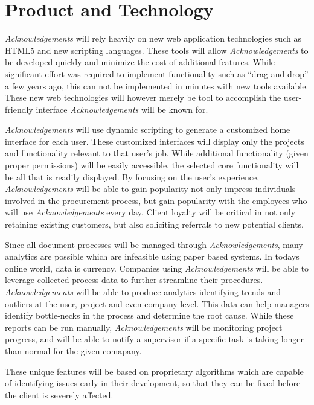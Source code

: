 \section{Product and Technology}
{\it Acknowledgements} will rely heavily on new web application technologies such as HTML5 and new scripting languages. These tools will allow {\it Acknowledgements} to be developed quickly and minimize the cost of additional features. While significant effort was required to implement functionality such as ``drag-and-drop'' a few years ago, this can not be implemented in minutes with new tools available. These new web technologies will however merely be tool to accomplish the user-friendly interface {\it Acknowledgements} will be known for.

{\it Acknowledgements} will use dynamic scripting to generate a customized home interface for each user. These customized interfaces will display only the projects and functionality relevant to that user's job. While additional functionality (given proper permissions) will be easily accessible, the selected core functionality will be all that is readily displayed. By focusing on the user's experience, {\it Acknowledgements} will be able to gain popularity not only impress individuals involved in the procurement process, but gain popularity with the employees who will use {\it Acknowledgements} every day. Client loyalty will be critical in not only retaining existing customers, but also soliciting referrals to new potential clients.

Since all document processes will be managed through {\it Acknowledgements}, many analytics are possible which are infeasible using paper based systems. In todays online world, data is currency. Companies using {\it Acknowledgements} will be able to leverage collected process data to further streamline their procedures. {\it Acknowledgements} will be able to produce analytics identifying trends and outliers at the user, project and even company level. This data can help managers identify bottle-necks in the process and determine the root cause. While these reports can be run manually, {\it Acknowledgements} will be monitoring project progress, and will be able to notify a supervisor if a specific task is taking longer than normal for the given comapany.

These unique features will be based on proprietary algorithms which are capable of identifying issues early in their development, so that they can be fixed before the client is severely affected.